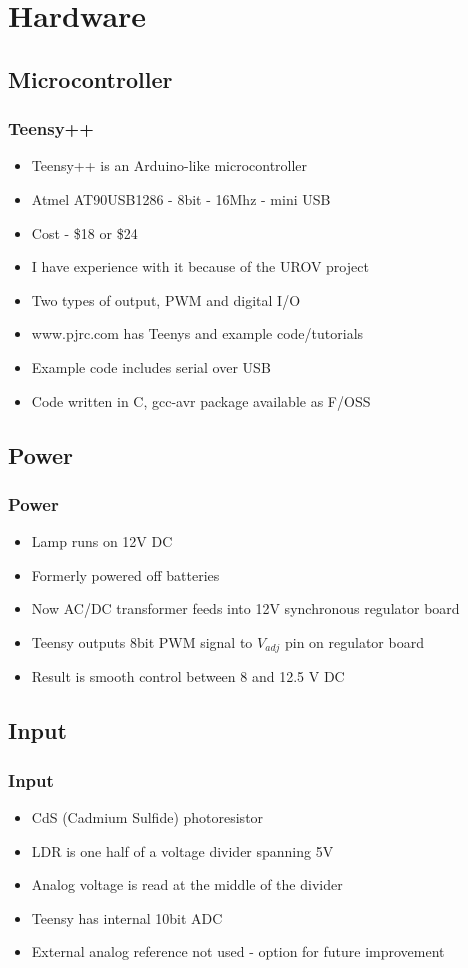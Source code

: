 \documentclass{beamer}
\begin{document}
\section{Hardware}
\subsection{Microcontroller}
\frame
{
	\frametitle{Teensy++}
	\begin{itemize}
		\item Teensy++ is an Arduino-like microcontroller
		\item Atmel AT90USB1286 - 8bit - 16Mhz - mini USB
		\item Cost - \$18 or \$24 
		\item I have experience with it because of the UROV project
		\item Two types of output, PWM and digital I/O
		\item www.pjrc.com has Teenys and example code/tutorials
		\item Example code includes serial over USB
		\item Code written in C, gcc-avr package available as F/OSS
	\end{itemize}
}

\subsection{Power}
\frame
{
	\frametitle{Power}
	\begin{itemize}
		\item Lamp runs on 12V DC
		\item Formerly powered off batteries
		\item Now AC/DC transformer feeds into 12V synchronous regulator board
		\item Teensy outputs 8bit PWM signal to $V_{adj}$ pin on regulator board
		\item Result is smooth control between 8 and 12.5 V DC
	\end{itemize}
}

\subsection{Input}
\frame
{
	\frametitle{Input}
	\begin{itemize}
		\item CdS (Cadmium Sulfide) photoresistor 
		\item LDR is one half of a voltage divider spanning 5V
		\item Analog voltage is read at the middle of the divider
		\item Teensy has internal 10bit ADC
		\item External analog reference not used - option for future improvement
	\end{itemize}
}
\end{document}
